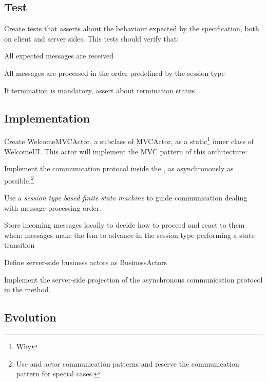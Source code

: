 \subsection{Test}
\label{sec:test}
Create tests that asserts about the behaviour expected by the
specification, both on client and server sides. This tests should
verify that:
\begin{task}
  All expected messages are received\\
\end{task}
\begin{task}
  All messages are processed in the order predefined by the session
  type
\end{task}
\begin{task}
  If termination is mandatory, assert about termination status
\end{task}

\subsection{Implementation}
\label{sec:implementation}
\begin{task}
  Create WelcomeMVCActor, a subclass of MVCActor, as a
  static\footnote{Why } inner class of WelcomeUI. This
  actor will implement the MVC pattern of this architecture:
  \begin{task}
    Implement the communication protocol inside the
    , as asynchronously as possible.\footnote{Use
       and  actor communication patterns and
      reserve the  communication pattern for special cases.}
  \end{task}
  \begin{task}
    Use a \emph{session type based finite state machine} to guide
    communication dealing with message processing order.
  \end{task}
  \begin{task}
    Store incoming messages locally to decide how to proceed and react
    to them when; messages make the fsm to advance in the session type
    performing a state transition
  \end{task}
  \begin{task}
    Define server-side business actors as BusinessActors
  \end{task}
  \begin{task}
    Implement the server-side projection of the asynchronous
    communication protocol in the  method.
  \end{task}
\end{task}
%

\subsection{Evolution}
\label{sec:evolution}






